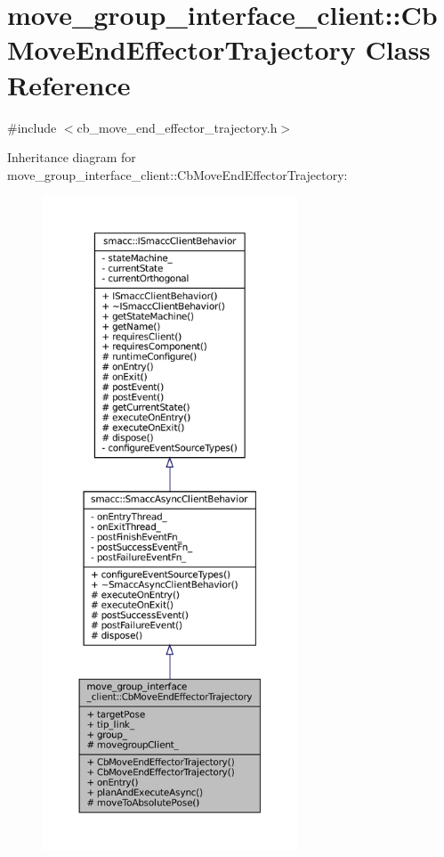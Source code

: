 \hypertarget{classmove__group__interface__client_1_1CbMoveEndEffectorTrajectory}{}\section{move\+\_\+group\+\_\+interface\+\_\+client\+:\+:Cb\+Move\+End\+Effector\+Trajectory Class Reference}
\label{classmove__group__interface__client_1_1CbMoveEndEffectorTrajectory}


{\ttfamily \#include $<$cb\+\_\+move\+\_\+end\+\_\+effector\+\_\+trajectory.\+h$>$}



Inheritance diagram for move\+\_\+group\+\_\+interface\+\_\+client\+:\+:Cb\+Move\+End\+Effector\+Trajectory\+:
\nopagebreak
\begin{figure}[H]
\begin{center}
\leavevmode
\includegraphics[height=550pt]{classmove__group__interface__client_1_1CbMoveEndEffectorTrajectory__inherit__graph}
\end{center}
\end{figure}


